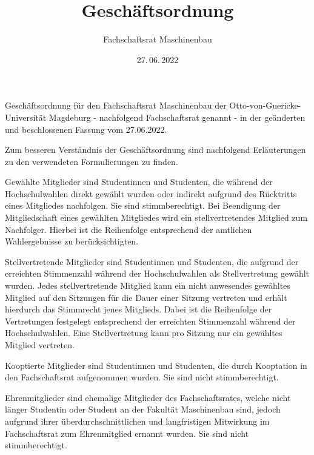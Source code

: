\documentclass[%
	parskip=half,
]{scrartcl}
\begin{document}
\title{Geschäftsordnung}
\date{27.\,06.\,2022}
\author{Fachschaftsrat Maschinenbau}

\maketitle

Geschäftsordnung für den Fachschaftsrat Maschinenbau der Otto-von-Guericke-Universität Magdeburg - nachfolgend
Fachschaftsrat genannt - in der geänderten und beschlossenen Fassung vom 27.06.2022.

\tableofcontents

\clearpage


Zum besseren Verständnis der Geschäftsordnung sind nachfolgend Erläuterungen zu den verwendeten Formulierungen zu 
finden.


Gewählte Mitglieder sind Studentinnen und Studenten, die während der Hochschulwahlen direkt gewählt wurden oder indirekt
aufgrund des Rücktritts eines Mitgliedes nachfolgen. Sie sind stimmberechtigt. Bei Beendigung der Mitgliedschaft eines
gewählten Mitgliedes wird ein stellvertretendes Mitglied zum Nachfolger. Hierbei ist die Reihenfolge entsprechend der
amtlichen Wahlergebnisse zu berücksichtigten.


Stellvertretende Mitglieder sind Studentinnen und Studenten, die aufgrund der erreichten Stimmenzahl während der
Hochschulwahlen als Stellvertretung gewählt wurden. Jedes stellvertretende Mitglied kann ein nicht anwesendes gewähltes
Mitglied auf den Sitzungen für die Dauer einer Sitzung vertreten und erhält hierdurch das Stimmrecht jenes Mitglieds.
Dabei ist die Reihenfolge der Vertretungen festgelegt entsprechend der erreichten Stimmenzahl während der
Hochschulwahlen. Eine Stellvertretung kann pro Sitzung nur ein gewähltes Mitglied vertreten.


Kooptierte Mitglieder sind Studentinnen und Studenten, die durch Kooptation in den Fachschaftsrat aufgenommen wurden.
Sie sind nicht stimmberechtigt.


Ehrenmitglieder sind ehemalige Mitglieder des Fachschaftsrates, welche nicht länger Studentin oder Student an der 
Fakultät Maschinenbau sind, jedoch aufgrund ihrer überdurchschnittlichen und langfristigen Mitwirkung im Fachschaftsrat 
zum Ehrenmitglied ernannt wurden. Sie sind nicht stimmberechtigt.
\end{document}
